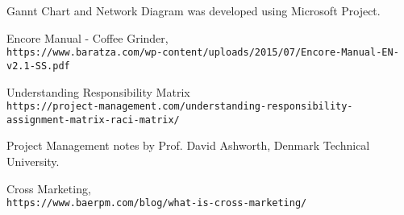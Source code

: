 
\begin{thebibliography}{5}
Gannt Chart and Network Diagram was developed using Microsoft Project. 

Encore Manual - Coffee Grinder,
\\\texttt{https://www.baratza.com/wp-content/uploads/2015/07/Encore-Manual-EN-v2.1-SS.pdf}

Understanding Responsibility Matrix
\\\texttt{https://project-management.com/understanding-responsibility-assignment-matrix-raci-matrix/}

 Project Management notes by Prof. David Ashworth, Denmark Technical University.

Cross Marketing,
\\\texttt{https://www.baerpm.com/blog/what-is-cross-marketing/}
\end{thebibliography}


